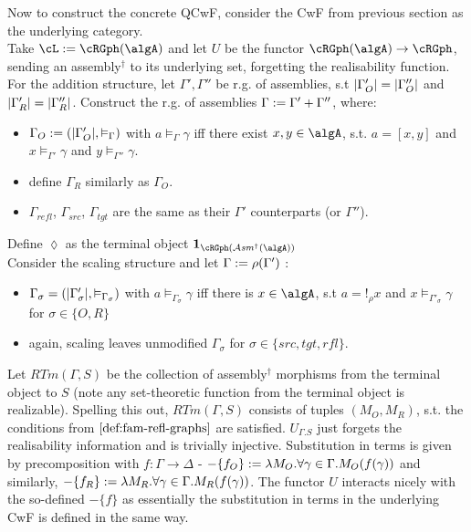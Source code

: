 \documentclass[12pt,a4paper]{article}
\def\cAsm{\mathcal{A}\mathit{sm}^\dagger}
\def\src{_{src}}\alwaysmath{src}
\def\rfl{_{refl}}\alwaysmath{rfl}
\def\tgt{_{tgt}}\alwaysmath{tgt}
\renewcommand{\O}{_{O}}
\newcommand{\R}{\ensuremath{_{R}}}
\begin{document}
Now to construct the concrete QCwF, consider the CwF from previous section as the underlying category.\\
Take $\cL := \cRGph(\algA)$ and let $U$ be the functor $\cRGph(\algA) \to \cRGph$, sending an assembly$^\dagger$ to its underlying set, forgetting the realisability function.\\
For the addition structure, let $\Gamma', \Gamma''$ be r.g. of assemblies, s.t  $\carr{\Gamma'\O}=\carr{\Gamma''\O}$ and $\carr{\Gamma'\R}=\carr{\Gamma''\R}$. Construct the r.g. of assemblies $\Gamma := \Gamma' + \Gamma''$, where:
\begin{itemize}[noitemsep]
    \item $\Gamma\O \define (\carr{\Gamma'\O}, \vDash_\Gamma)$ with $ a \vDash_\Gamma \gamma$ iff there exist $x,y \in \algA$, s.t. $a = [x,y]$ and $x \vDash_{\Gamma'} \gamma$ and $ y \vDash_{\Gamma''} \gamma$.

    \item define $\Gamma\R$ similarly as $\Gamma\O$.

    \item $\Gamma\rfl$, $\Gamma\src$, $\Gamma\tgt$ are the same as their $\Gamma'$ counterparts (or $\Gamma''$).\\
\end{itemize}
Define $\lozenge$ as the terminal object $\mathbf{1}_{\cRGph(\cAsm(\algA))}$\\
Consider the scaling structure and let $\Gamma := \rho(\Gamma')$ :
  \begin{itemize}
    \item $\Gamma_\sigma = (|\Gamma'_\sigma|, \vDash_{\Gamma_\sigma})$ with $a \vDash_{\Gamma_\sigma} \gamma$ iff there is $x \in \algA$, s.t $a = !_\rho x$ and $x \vDash_{\Gamma'_\sigma} \gamma$ for $\sigma \in \{O, R\}$
    
    \item again, scaling leaves unmodified $\Gamma_\sigma$ for $\sigma\in\{src,tgt,rfl\}$.
\end{itemize}
Let $RTm(\Gamma, S)$ be the collection of assembly$^\dagger$ morphisms from the terminal object to $S$ (note any set-theoretic function from the terminal object is realizable). Spelling this out, $RTm(\Gamma, S)$ consists of tuples $(M\O, M\R)$, s.t. the conditions from $\cref{def:fam-refl-graphs}$ are satisfied. $U_{\Gamma.S}$ just forgets the realisability information and is trivially injective. Substitution in terms is given by precomposition with $f : \Gamma \to \Delta$ - $-\{f\O\} \define \lambda M\O. \forall \gamma \in \Gamma . M\O(f(\gamma))$ and similarly, $-\{f\R\} \define \lambda M\R . \forall \gamma \in \Gamma . M\R(f(\gamma))$. The functor $U$ interacts nicely with the so-defined $-\{f\}$ as essentially the substitution in terms in the underlying CwF is defined in the same way.\\
\end{document}
